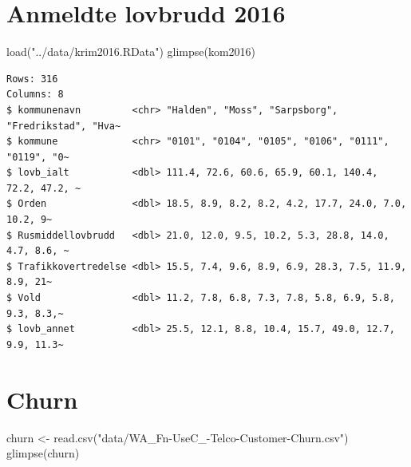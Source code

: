 \documentclass[
  letterpaper,
  DIV=11,
  numbers=noendperiod]{scrreprt}
\newenvironment{Shaded}{\begin{snugshade}}{\end{snugshade}}
\newcommand{\FunctionTok}[1]{\textcolor[rgb]{0.28,0.35,0.67}{#1}}
\newcommand{\NormalTok}[1]{\textcolor[rgb]{0.00,0.23,0.31}{#1}}
\newcommand{\OtherTok}[1]{\textcolor[rgb]{0.00,0.23,0.31}{#1}}
\newcommand{\StringTok}[1]{\textcolor[rgb]{0.13,0.47,0.30}{#1}}
\theoremstyle{definition}
\theoremstyle{remark}
\begin{document}
\hypertarget{anmeldte-lovbrudd-2016}{%
\section{Anmeldte lovbrudd 2016}\label{anmeldte-lovbrudd-2016}}

\begin{Shaded}
\begin{Highlighting}[]
\FunctionTok{load}\NormalTok{(}\StringTok{"../data/krim2016.RData"}\NormalTok{)}
\FunctionTok{glimpse}\NormalTok{(kom2016)}
\end{Highlighting}
\end{Shaded}

\begin{verbatim}
Rows: 316
Columns: 8
$ kommunenavn         <chr> "Halden", "Moss", "Sarpsborg", "Fredrikstad", "Hva~
$ kommune             <chr> "0101", "0104", "0105", "0106", "0111", "0119", "0~
$ lovb_ialt           <dbl> 111.4, 72.6, 60.6, 65.9, 60.1, 140.4, 72.2, 47.2, ~
$ Orden               <dbl> 18.5, 8.9, 8.2, 8.2, 4.2, 17.7, 24.0, 7.0, 10.2, 9~
$ Rusmiddellovbrudd   <dbl> 21.0, 12.0, 9.5, 10.2, 5.3, 28.8, 14.0, 4.7, 8.6, ~
$ Trafikkovertredelse <dbl> 15.5, 7.4, 9.6, 8.9, 6.9, 28.3, 7.5, 11.9, 8.9, 21~
$ Vold                <dbl> 11.2, 7.8, 6.8, 7.3, 7.8, 5.8, 6.9, 5.8, 9.3, 8.3,~
$ lovb_annet          <dbl> 25.5, 12.1, 8.8, 10.4, 15.7, 49.0, 12.7, 9.9, 11.3~
\end{verbatim}

\hypertarget{churn}{%
\section{Churn}\label{churn}}

\begin{Shaded}
\begin{Highlighting}[]
\NormalTok{churn }\OtherTok{\textless{}{-}} \FunctionTok{read.csv}\NormalTok{(}\StringTok{"data/WA\_Fn{-}UseC\_{-}Telco{-}Customer{-}Churn.csv"}\NormalTok{)}
\FunctionTok{glimpse}\NormalTok{(churn)}
\end{Highlighting}
\end{Shaded}
\end{document}
